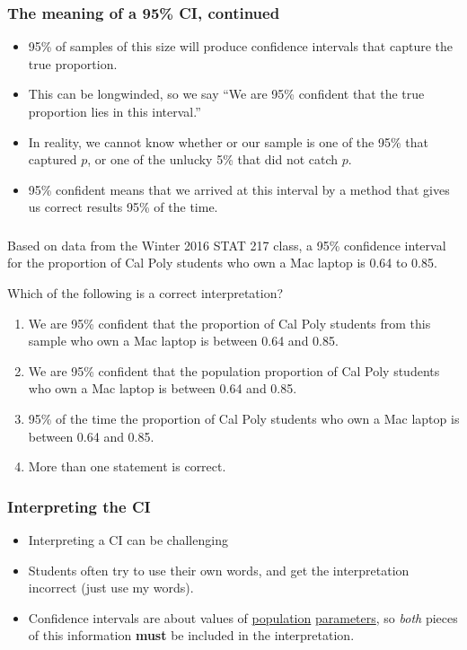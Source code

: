 \begin{frame}
\frametitle{The meaning of a 95\% CI, continued}
\begin{itemize}
\item
95\% of samples of this size will produce confidence intervals that capture the true proportion.
\item
This can be longwinded, so we say ``We are 95\% confident that the true proportion lies in this interval.''
\item
In reality, we cannot know whether or our sample is one of the 95\% that captured $p$, or one of the unlucky 5\% that did not catch $p$.
\item
95\% confident means that we arrived at this interval by a method that gives us correct results 95\% of the time.
\end{itemize}
\end{frame}

\begin{frame}
\frametitle{\grp}
Based on data from the Winter 2016 STAT 217 class, a 95\% confidence interval for the proportion of Cal Poly students who own a Mac laptop is 0.64 to 0.85.
\begin{clicker}{Which of the following is a correct interpretation?}
\begin{enumerate}
    \item
    We are 95\% confident that the proportion of Cal Poly students from this sample who own a Mac laptop is between 0.64 and 0.85.
    \item
    We are 95\% confident that the population proportion of Cal Poly students who own a Mac laptop is between 0.64 and 0.85.
    \item
    95\% of the time the proportion of Cal Poly students who own a Mac laptop is between 0.64 and 0.85.
    \item
    More than one statement is correct.
\end{enumerate}
\end{clicker}
\end{frame}

\begin{frame}
\frametitle{Interpreting the CI}
\begin{itemize}
    \item
    Interpreting a CI can be challenging
    \item
    Students often try to use their own words, and get the interpretation incorrect (just use my words).
    \item
    Confidence intervals are about values of \underline{population} \underline{parameters}, so \emph{both} pieces of this information \textbf{must} be included in the interpretation.
\end{itemize}
\end{frame}

